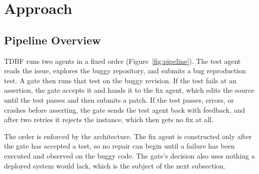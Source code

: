 \section{Approach}
\label{sec:approach}

\subsection{Pipeline Overview}
\label{sec:method-overview}

TDBF runs two agents in a fixed order (Figure~\ref{fig:pipeline}). The test
agent reads the issue, explores the buggy repository, and submits a bug
reproduction test. A gate then runs that test on the buggy revision. If the
test fails at an assertion, the gate accepts it and hands it to the fix agent,
which edits the source until the test passes and then submits a patch. If the
test passes, errors, or crashes before asserting, the gate sends the test agent
back with feedback, and after two retries it rejects the instance, which then
gets no fix at all.

The order is enforced by the architecture. The fix agent is constructed only
after the gate has accepted a test, so no repair can begin until a failure has
been executed and observed on the buggy code. The gate's decision also uses
nothing a deployed system would lack, which is the subject of the next
subsection.

